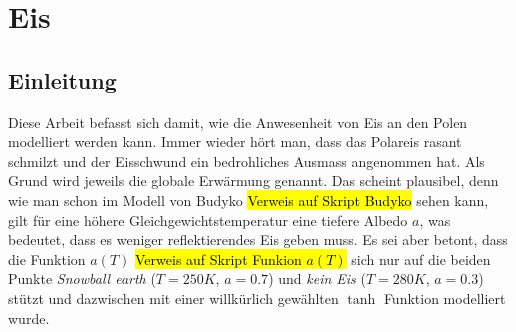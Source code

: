 %
%
%
\chapter{Eis\label{chapter:eis}}
\begin{refsection}

\section{Einleitung}
Diese Arbeit befasst sich damit, wie die Anwesenheit von Eis an den Polen modelliert werden kann. Immer wieder hört man, dass das Polareis rasant schmilzt und der Eisschwund ein bedrohliches Ausmass angenommen hat. Als Grund wird jeweils die globale Erwärmung genannt. Das scheint plausibel, denn wie man schon im Modell von Budyko \hl{Verweis auf Skript Budyko} sehen kann, gilt für eine höhere Gleichgewichtstemperatur eine tiefere Albedo $a$, was bedeutet, dass es weniger reflektierendes Eis geben muss. Es sei aber betont, dass die Funktion $a(T)$ \hl{Verweis auf Skript Funkion $a(T)$} sich nur auf die beiden Punkte {\em Snowball earth} ($T=250K$, $a=0.7$) und {\em kein Eis} ($T=280K$, $a=0.3$) stützt und dazwischen mit einer willkürlich gewählten $\tanh$ Funktion modelliert wurde. 

\end{refsection}
